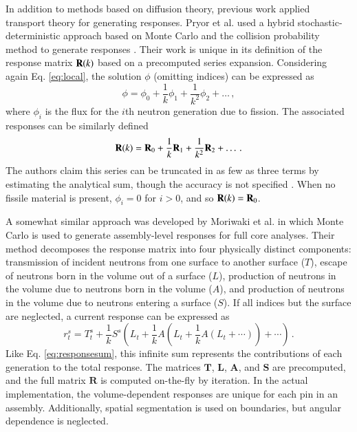 In addition to methods based on diffusion theory, previous work applied 
transport theory for generating responses. Pryor et al. used 
a hybrid stochastic-deterministic approach based on
Monte Carlo and the collision probability 
method to generate responses \cite{pryor1973rmm, pryor1975rdr,
sicilian1975atr}.  Their work is unique in its definition
of the response matrix $\mathbf{R}(k)$ based on a precomputed 
series expansion.  Considering again Eq. \ref{eq:local}, the 
solution $\phi$ (omitting 
indices) can
be expressed as
\begin{equation}
 \phi = \phi_{0} + \frac{1}{k}\phi_{1}
                 + \frac{1}{k^2}\phi_{2}  + \ldots \, ,
\end{equation}
where $\phi_{i} $ is the flux for the $i$th neutron
generation due to fission.  The 
associated responses can be similarly defined
\begin{equation}
 \mathbf{R}(k) = \mathbf{R}_0 + \frac{1}{k}\mathbf{R}_1
                 + \frac{1}{k^2}\mathbf{R}_2  + \ldots \, .
\label{eq:responsesum}
\end{equation}
The authors claim this series can be truncated in as few as three terms 
by estimating the analytical sum, though the accuracy is not 
specified \cite{sicilian1975atr}.  When no fissile material is present, 
$\phi_{i} = 0$ for $i > 0$, and so $\mathbf{R}(k) = \mathbf{R}_0$.


A somewhat similar approach was developed by 
Moriwaki et al. \cite{moriwaki1999ndc}
in which Monte Carlo is used to 
generate assembly-level responses for full core analyses. 
Their method decomposes the response
matrix into four physically distinct components: 
transmission of incident neutrons from one surface to another surface ($T$), 
escape of neutrons born in the volume out of a surface ($L$), 
production of neutrons in the volume due to neutrons born in the 
volume ($A$), and production of neutrons in the volume due to neutrons 
entering a surface ($S$). If all indices but the 
surface are neglected, a current response can be expressed as
\begin{equation}
 r^{s}_{t} = T^s_t + \frac{1}{k}S^s(L_t + \frac{1}{k}A(L_t 
                   + \frac{1}{k}A(L_t + \cdots )) + \cdots) \, .
\label{eq:responseiterate}
\end{equation}
Like Eq. \ref{eq:responsesum}, this infinite sum 
represents the contributions of each generation to the 
total response.  The
matrices $\mathbf{T}$, $\mathbf{L}$, $\mathbf{A}$, and $\mathbf{S}$ 
are precomputed, and the full matrix $\mathbf{R}$ is
computed on-the-fly by iteration.  In the actual implementation, the 
volume-dependent responses are unique for each pin in an assembly.  
Additionally, spatial segmentation is used on boundaries, but angular 
dependence is neglected.

